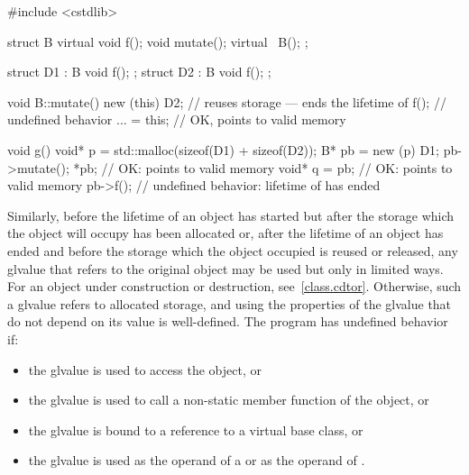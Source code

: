 \begin{example}
\begin{codeblock}
#include <cstdlib>

struct B {
  virtual void f();
  void mutate();
  virtual ~B();
};

struct D1 : B { void f(); };
struct D2 : B { void f(); };

void B::mutate() {
  new (this) D2;    // reuses storage --- ends the lifetime of 
  f();              // undefined behavior
  ... = this;       // OK,  points to valid memory
}

void g() {
  void* p = std::malloc(sizeof(D1) + sizeof(D2));
  B* pb = new (p) D1;
  pb->mutate();
  *pb;              // OK:  points to valid memory
  void* q = pb;     // OK:  points to valid memory
  pb->f();          // undefined behavior: lifetime of  has ended
}
\end{codeblock}
\end{example}

\pnum
Similarly, before the lifetime of an object has started but after the
storage which the object will occupy has been allocated or, after the
lifetime of an object has ended and before the storage which the object
occupied is reused or released, any glvalue that refers to the original
object may be used but only in limited ways.
For an object under construction or destruction, see~\ref{class.cdtor}.
Otherwise, such
a glvalue refers to
allocated storage, and using the
properties of the glvalue that do not depend on its value is
well-defined. The program has undefined behavior if:
\begin{itemize}
\item the glvalue is used to access the object, or
\item the glvalue is used to call a non-static member function of the object, or
\item the glvalue is bound to a reference to a virtual base class, or
\item the glvalue is used as the operand of a
 or as the operand of
.
\end{itemize}

